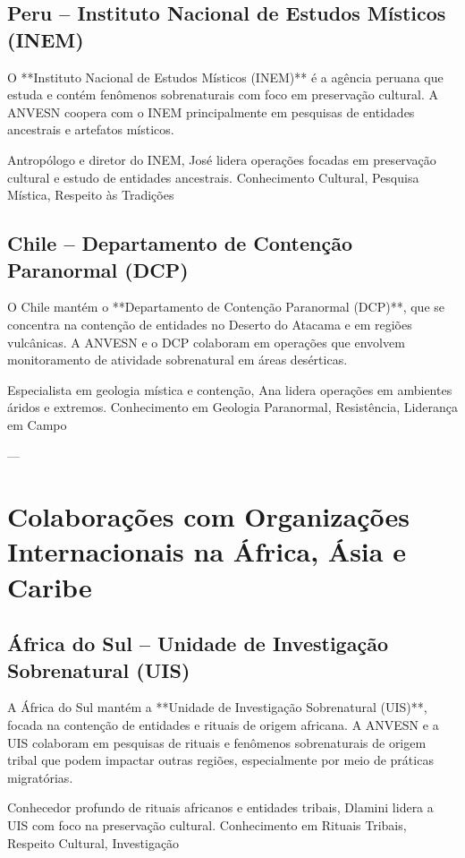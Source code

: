 \subsection{Peru – Instituto Nacional de Estudos Místicos (INEM)}
O **Instituto Nacional de Estudos Místicos (INEM)** é a agência peruana que estuda e contém fenômenos sobrenaturais com foco em preservação cultural. A ANVESN coopera com o INEM principalmente em pesquisas de entidades ancestrais e artefatos místicos.

{Antropólogo e diretor do INEM, José lidera operações focadas em preservação cultural e estudo de entidades ancestrais.}
{Conhecimento Cultural, Pesquisa Mística, Respeito às Tradições}

\subsection{Chile – Departamento de Contenção Paranormal (DCP)}
O Chile mantém o **Departamento de Contenção Paranormal (DCP)**, que se concentra na contenção de entidades no Deserto do Atacama e em regiões vulcânicas. A ANVESN e o DCP colaboram em operações que envolvem monitoramento de atividade sobrenatural em áreas desérticas.

{Especialista em geologia mística e contenção, Ana lidera operações em ambientes áridos e extremos.}
{Conhecimento em Geologia Paranormal, Resistência, Liderança em Campo}

---

\section{Colaborações com Organizações Internacionais na África, Ásia e Caribe}

\subsection{África do Sul – Unidade de Investigação Sobrenatural (UIS)}
A África do Sul mantém a **Unidade de Investigação Sobrenatural (UIS)**, focada na contenção de entidades e rituais de origem africana. A ANVESN e a UIS colaboram em pesquisas de rituais e fenômenos sobrenaturais de origem tribal que podem impactar outras regiões, especialmente por meio de práticas migratórias.

{Conhecedor profundo de rituais africanos e entidades tribais, Dlamini lidera a UIS com foco na preservação cultural.}
{Conhecimento em Rituais Tribais, Respeito Cultural, Investigação}

